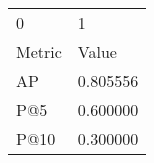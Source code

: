 \begin{tabular}{ll}
0 & 1 \\
Metric & Value \\
AP & 0.805556 \\
P@5 & 0.600000 \\
P@10 & 0.300000 \\
\end{tabular}
